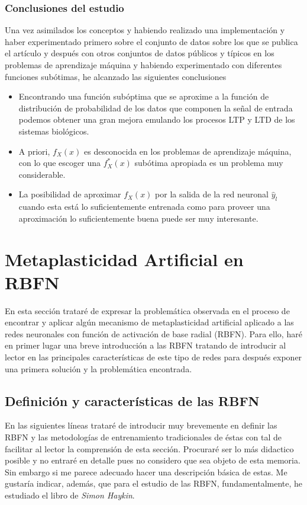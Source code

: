 \documentclass[10pt,a4paper]{report}
\begin{document}
\subsubsection{Conclusiones del estudio}
Una vez asimilados los conceptos y habiendo realizado una implementación y haber experimentado primero sobre el conjunto de datos sobre los que se publica el artículo y después con otros conjuntos de datos públicos y típicos en los problemas de aprendizaje máquina y habiendo experimentado con diferentes funciones subótimas, he alcanzado las siguientes conclusiones
\begin{itemize}
	\item Encontrando una función subóptima que se aproxime a la función de distribución de probabilidad de los datos que componen la señal de entrada podemos obtener una gran mejora emulando los procesos LTP y LTD de los sistemas biológicos.
	\item A priori, $f_X(x)$ es desconocida en los problemas de aprendizaje máquina, con lo que escoger una $f^*_X(x)$ subótima apropiada es un problema muy considerable.
	\item La posibilidad de aproximar $f_X(x)$ por la salida de la red neuronal $\widehat{y}_l$ cuando esta está lo suficientemente entrenada como para proveer una aproximación lo suficientemente buena puede ser muy interesante.
\end{itemize}

\section{Metaplasticidad Artificial en RBFN}
En esta sección trataré de expresar la problemática observada en el proceso de encontrar y aplicar algún mecanismo de metaplasticidad artificial aplicado a las redes neuronales con función de activación de base radial (RBFN). Para ello, haré en primer lugar una breve introducción a las RBFN tratando de introducir al lector en las principales características de este tipo de redes para después exponer una primera solución y la problemática encontrada.
\subsection{Definición y características de las RBFN}
En las siguientes líneas trataré de introducir muy brevemente en definir las RBFN y las metodologías de entrenamiento tradicionales de éstas con tal de facilitar al lector la comprensión de esta sección. Procuraré ser lo más didactico posible y no entraré en detalle pues no considero que sea objeto de esta memoria. Sin embargo si me parece adecuado hacer una descripción básica de estas. Me gustaría indicar, además, que para el estudio de las RBFN, fundamentalmente, he estudiado el libro de \textit{Simon Haykin}\cite{haykin99a}.
\end{document}

